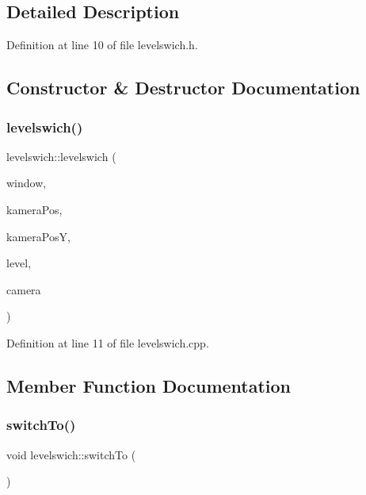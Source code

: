 \subsection{Detailed Description}


Definition at line 10 of file levelswich.\+h.



\subsection{Constructor \& Destructor Documentation}
\hypertarget{classlevelswich_adf18e229424c4cd649cb454fed0dc5a4}{}\label{classlevelswich_adf18e229424c4cd649cb454fed0dc5a4} 
\subsubsection{\texorpdfstring{levelswich()}{levelswich()}}
{\footnotesize\ttfamily levelswich\+::levelswich (\begin{DoxyParamCaption}\item[{sf\+::\+Render\+Window \&}]{window,  }\item[{int}]{kamera\+Pos,  }\item[{int}]{kamera\+PosY,  }\item[{int}]{level,  }\item[{sf\+::\+View \&}]{camera }\end{DoxyParamCaption})}



Definition at line 11 of file levelswich.\+cpp.



\subsection{Member Function Documentation}
\hypertarget{classlevelswich_a0ef443c96e4db2bcbee624e59d622699}{}\label{classlevelswich_a0ef443c96e4db2bcbee624e59d622699} 
\subsubsection{\texorpdfstring{switch\+To()}{switchTo()}}
{\footnotesize\ttfamily void levelswich\+::switch\+To (\begin{DoxyParamCaption}{ }\end{DoxyParamCaption})}



